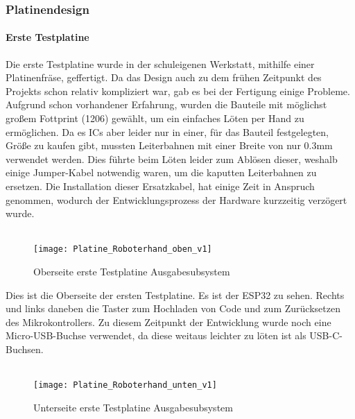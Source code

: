 \documentclass[titlepage,12pt,twoside]{article}
\begin{document}
\subsubsection{Platinendesign}
\label{chap:Platinendesign Roboterhand}
\paragraph{Erste Testplatine}
\hfill \break
\hfill \break
Die erste Testplatine wurde in der schuleigenen Werkstatt, mithilfe einer Platinenfräse, geffertigt. Da das Design auch zu dem frühen Zeitpunkt des Projekts schon relativ kompliziert war, gab es bei der Fertigung einige Probleme.
Aufgrund schon vorhandener Erfahrung, wurden die Bauteile mit möglichst großem Fottprint (1206) gewählt, um ein einfaches Löten per Hand zu ermöglichen. Da es ICs aber leider nur in einer, für das Bauteil festgelegten, Größe zu kaufen gibt,
mussten Leiterbahnen mit einer Breite von nur 0.3mm verwendet werden. Dies führte beim Löten leider zum Ablösen dieser, weshalb einige Jumper-Kabel notwendig waren, um die kaputten Leiterbahnen zu ersetzen. Die Installation dieser 
Ersatzkabel, hat einige Zeit in Anspruch genommen, wodurch der Entwicklungsprozess der Hardware kurzzeitig verzögert wurde. \\
\\ 
\begin{figure}[H]
	\begin{center}
		\scalebox{0.6}
		{\texttt{[image: Platine\_Roboterhand\_oben\_v1]}}
		\caption{Oberseite erste Testplatine Ausgabesubsystem}
		\label{fig:Platine_Roboterhand_oben_v1}		
	\end{center}
\end{figure}
\hfill \break
Dies ist die Oberseite der ersten Testplatine. Es ist der ESP32 zu sehen. Rechts und links daneben die Taster zum Hochladen von Code und zum Zurücksetzen des Mikrokontrollers. Zu diesem Zeitpunkt der Entwicklung wurde noch eine Micro-USB-Buchse
verwendet, da diese weitaus leichter zu löten ist als USB-C-Buchsen. \\
\\
\begin{figure}[H]
	\begin{center}
		\scalebox{0.6}
		{\texttt{[image: Platine\_Roboterhand\_unten\_v1]}}
		\caption{Unterseite erste Testplatine Ausgabesubsystem}
		\label{fig:Platine_Roboterhand_unten_v1}		
	\end{center}
\end{figure}
\end{document}
